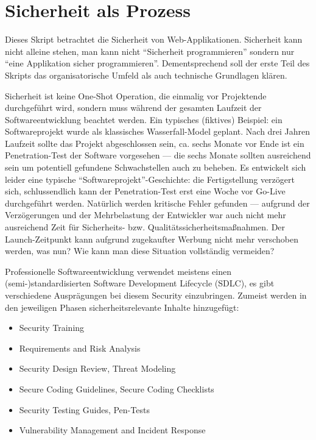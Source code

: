 \chapter{Sicherheit als Prozess}

Dieses Skript betrachtet die Sicherheit von Web-Applikationen. Sicherheit kann nicht alleine stehen, man kann nicht ``Sicherheit programmieren'' sondern nur ``eine Applikation sicher programmieren''. Dementsprechend soll der erste Teil des Skripts das organisatorische Umfeld als auch technische Grundlagen klären.

Sicherheit ist keine One-Shot Operation, die einmalig vor Projektende durchgeführt wird, sondern muss während der gesamten Laufzeit der Softwareentwicklung beachtet werden. Ein typisches (fiktives) Beispiel: ein Softwareprojekt wurde als klassisches Wasserfall-Model geplant. Nach drei Jahren Laufzeit sollte das Projekt abgeschlossen sein, ca. sechs Monate vor Ende ist ein Penetration-Test der Software vorgesehen --- die sechs Monate sollten ausreichend sein um potentiell gefundene Schwachstellen auch zu beheben. Es entwickelt sich leider eine typische ``Softwareprojekt''-Geschichte: die Fertigstellung verzögert sich, schlussendlich kann der Penetration-Test erst eine Woche vor Go-Live durchgeführt werden. Natürlich werden kritische Fehler gefunden --- aufgrund der Verzögerungen und der Mehrbelastung der Entwickler war auch nicht mehr ausreichend Zeit für Sicherheits- bzw. Qualitätssicherheitsmaßnahmen. Der Launch-Zeitpunkt kann aufgrund zugekaufter Werbung nicht mehr verschoben werden, was nun? Wie kann man diese Situation vollständig vermeiden?

Professionelle Softwareentwicklung verwendet meistens einen (semi-)standardisierten Software Development Lifecycle (SDLC), es gibt verschiedene Ausprägungen bei diesem Security einzubringen. Zumeist werden in den jeweiligen Phasen sicherheitsrelevante Inhalte hinzugefügt:

\begin{itemize}
	\item Security Training
	\item Requirements and Risk Analysis
	\item Security Design Review, Threat Modeling
	\item Secure Coding Guidelines, Secure Coding Checklists
	\item Security Testing Guides, Pen-Tests
	\item Vulnerability Management and Incident Response
\end{itemize}

